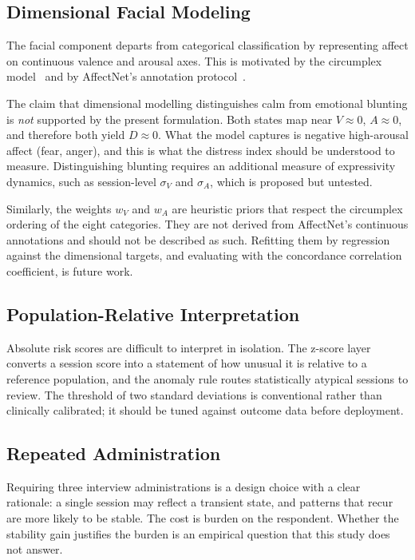 \documentclass[12pt]{article}
\begin{document}
\subsection{Dimensional Facial Modeling}

The facial component departs from categorical classification by
representing affect on continuous valence and arousal axes. This is
motivated by the circumplex model~\cite{russell1980circumplex} and by
AffectNet's annotation protocol~\cite{mollahosseini2017affectnet}.

The claim that dimensional modelling distinguishes calm from emotional
blunting is \emph{not} supported by the present formulation. Both
states map near $V \approx 0$, $A \approx 0$, and therefore both yield
$D \approx 0$. What the model captures is negative high-arousal affect
(fear, anger), and this is what the distress index should be understood
to measure. Distinguishing blunting requires an additional measure of
expressivity dynamics, such as session-level $\sigma_V$ and $\sigma_A$,
which is proposed but untested.

Similarly, the weights $w_V$ and $w_A$ are heuristic priors that respect
the circumplex ordering of the eight categories. They are not derived
from AffectNet's continuous annotations and should not be described as
such. Refitting them by regression against the dimensional targets, and
evaluating with the concordance correlation coefficient, is future work.

\subsection{Population-Relative Interpretation}

Absolute risk scores are difficult to interpret in isolation. The
z-score layer converts a session score into a statement of how unusual
it is relative to a reference population, and the anomaly rule routes
statistically atypical sessions to review. The threshold of two
standard deviations is conventional rather than clinically calibrated;
it should be tuned against outcome data before deployment.

\subsection{Repeated Administration}

Requiring three interview administrations is a design choice with a
clear rationale: a single session may reflect a transient state, and
patterns that recur are more likely to be stable. The cost is burden on
the respondent. Whether the stability gain justifies the burden is an
empirical question that this study does not answer.
\end{document}
